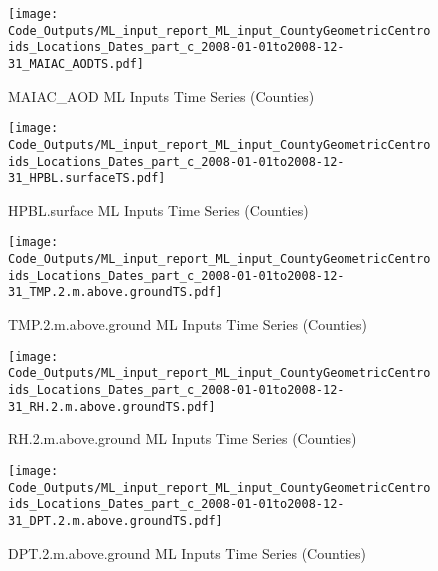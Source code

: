 \begin{figure} 
\centering  
\texttt{[image: Code\_Outputs/ML\_input\_report\_ML\_input\_CountyGeometricCentroids\_Locations\_Dates\_part\_c\_2008-01-01to2008-12-31\_MAIAC\_AODTS.pdf]} 
\caption{\label{fig:ML_input_report_ML_input_CountyGeometricCentroids_Locations_Dates_part_c_2008-01-01to2008-12-31MAIAC_AODTS}MAIAC_AOD ML Inputs Time Series (Counties)} 
\end{figure} 
 

\begin{figure} 
\centering  
\texttt{[image: Code\_Outputs/ML\_input\_report\_ML\_input\_CountyGeometricCentroids\_Locations\_Dates\_part\_c\_2008-01-01to2008-12-31\_HPBL.surfaceTS.pdf]} 
\caption{\label{fig:ML_input_report_ML_input_CountyGeometricCentroids_Locations_Dates_part_c_2008-01-01to2008-12-31HPBL.surfaceTS}HPBL.surface ML Inputs Time Series (Counties)} 
\end{figure} 
 

\begin{figure} 
\centering  
\texttt{[image: Code\_Outputs/ML\_input\_report\_ML\_input\_CountyGeometricCentroids\_Locations\_Dates\_part\_c\_2008-01-01to2008-12-31\_TMP.2.m.above.groundTS.pdf]} 
\caption{\label{fig:ML_input_report_ML_input_CountyGeometricCentroids_Locations_Dates_part_c_2008-01-01to2008-12-31TMP.2.m.above.groundTS}TMP.2.m.above.ground ML Inputs Time Series (Counties)} 
\end{figure} 
 

\begin{figure} 
\centering  
\texttt{[image: Code\_Outputs/ML\_input\_report\_ML\_input\_CountyGeometricCentroids\_Locations\_Dates\_part\_c\_2008-01-01to2008-12-31\_RH.2.m.above.groundTS.pdf]} 
\caption{\label{fig:ML_input_report_ML_input_CountyGeometricCentroids_Locations_Dates_part_c_2008-01-01to2008-12-31RH.2.m.above.groundTS}RH.2.m.above.ground ML Inputs Time Series (Counties)} 
\end{figure} 
 

\begin{figure} 
\centering  
\texttt{[image: Code\_Outputs/ML\_input\_report\_ML\_input\_CountyGeometricCentroids\_Locations\_Dates\_part\_c\_2008-01-01to2008-12-31\_DPT.2.m.above.groundTS.pdf]} 
\caption{\label{fig:ML_input_report_ML_input_CountyGeometricCentroids_Locations_Dates_part_c_2008-01-01to2008-12-31DPT.2.m.above.groundTS}DPT.2.m.above.ground ML Inputs Time Series (Counties)} 
\end{figure} 
 

